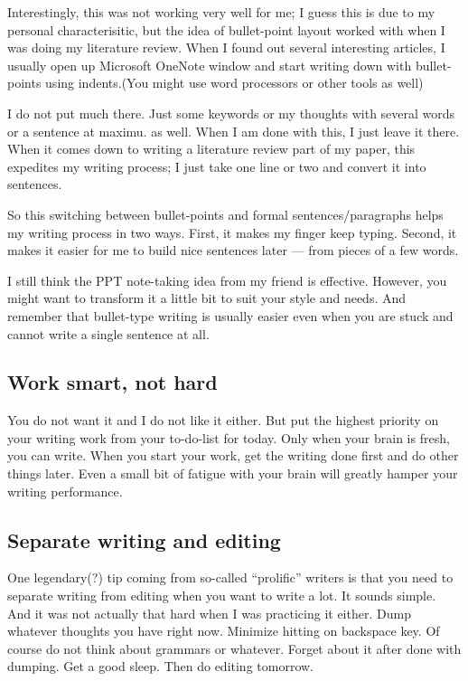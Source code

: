 \documentclass[11pt]{article}
\begin{document}
Interestingly, this was not working very well for me; I guess this is due to
my personal characterisitic, but the idea of bullet-point layout worked with
when I was doing my literature review. When I found out several interesting
articles, I usually open up Microsoft OneNote window and start writing down
with bullet-points using indents.(You might use word processors or other tools
as well)

I do not put much there. Just some keywords or my thoughts with several words
or a sentence at maximu.  as well. When I am done with this, I just leave it
there. When it comes down to writing a literature review part of my paper,
this expedites my writing process; I just take one line or two and convert it
into sentences. 

So this switching between bullet-points and formal sentences/paragraphs helps
my writing process in two ways. First, it makes my finger keep typing. Second,
it makes it easier for me to build nice sentences later --- from pieces of a
few words.

I still think the PPT note-taking idea from my friend is effective. However,
you might want to transform it a little bit to suit your style and needs. And
remember that bullet-type writing is usually easier even when you are stuck
and cannot write a single sentence at all.

\subsection{Work smart, not hard}

You do not want it and I do not like it either. But put the
highest priority on your writing work from your to-do-list for
today. Only when your brain is fresh, you can write. When you
start your work, get the writing done first and do other things
later. Even a small bit of fatigue with your brain will greatly
hamper your writing performance.

\subsection{Separate writing and editing}
One legendary(?) tip coming from so-called ``prolific'' writers is
that you need to separate writing from editing when you want to write
a lot. It sounds simple. And it was not actually that hard when I
was practicing it either. Dump whatever thoughts you have right now.
Minimize hitting on backspace key. Of course do not think about grammars
or whatever. Forget about it after done with dumping. Get a good sleep.
Then do editing tomorrow.
\end{document}
